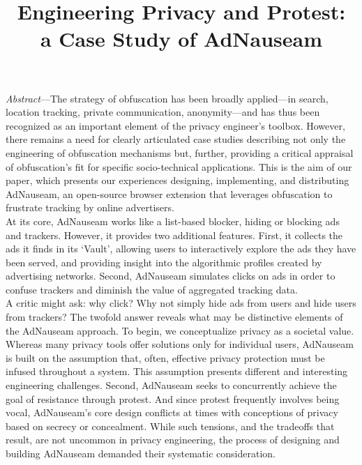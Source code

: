 \documentclass[conference]{IEEEtran}
\begin{document}
\title{Engineering Privacy and Protest:\\a Case Study of AdNauseam}

\author{
   \and
}

\maketitle

\emph{Abstract}---The strategy of obfuscation has been broadly applied---in search, location tracking, private communication, anonymity---and has thus been recognized as an important element of the privacy engineer's toolbox. However, there remains a need for clearly articulated case studies describing not only the engineering of obfuscation mechanisms but, further, providing a critical appraisal of obfuscation's fit for specific socio-technical applications. This is the aim of our paper, which presents our experiences designing, implementing, and distributing AdNauseam, an open-source browser extension that leverages obfuscation to frustrate tracking by online advertisers.\\
\indent At its core, AdNauseam works like a list-based blocker, hiding or blocking ads and trackers. However, it provides two additional features. First, it collects the ads it finds in its ‘Vault’, allowing users to interactively explore the ads they have been served, and providing insight into the algorithmic profiles created by advertising networks. Second, AdNauseam simulates clicks on ads in order to confuse trackers and diminish the value of aggregated tracking data.\\
\indent A critic might ask: why click? Why not simply hide ads from users and hide users from trackers? The twofold answer reveals what may be distinctive elements of the AdNauseam approach. To begin, we conceptualize privacy as a societal value. Whereas many privacy tools offer solutions only for individual users, AdNauseam is built on the assumption that, often, effective privacy protection must be infused throughout a system. This assumption presents different and interesting engineering challenges. Second, AdNauseam seeks to concurrently achieve the goal of resistance through protest. And since protest frequently involves being vocal, AdNauseam's core design conflicts at times with conceptions of privacy based on secrecy or concealment. While such tensions, and the tradeoffs that result, are not uncommon in privacy engineering, the process of designing and building AdNauseam demanded their systematic consideration.\\
\end{document}
